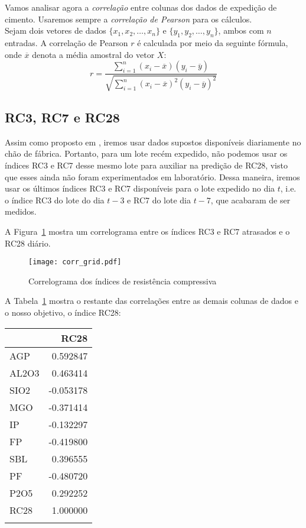Vamos analisar agora a \textit{correlação} entre colunas dos dados de expedição
de cimento. Usaremos sempre a \textit{correlação de Pearson} para os cálculos.
\\
Sejam dois vetores de
dados $\{x_1,x_2, \dots , x_n\}$ e $\{y_1,y_2, \dots , y_n\}$, ambos com $n$ entradas. A correlação de Pearson $r$ é calculada
por meio da seguinte fórmula, onde $\overline{x}$ denota a média amostral do
vetor $X$: \\



\[ r = \frac{{}\sum_{i=1}^{n} (x_i - \overline{x})(y_i - \overline{y})}
{\sqrt{\sum_{i=1}^{n} (x_i - \overline{x})^2(y_i - \overline{y})^2}} \] 


\bigskip

\subsection{RC3, RC7 e RC28}

Assim como proposto em \cite{grecialin}, iremos usar dados supostos disponíveis diariamente no chão de fábrica. Portanto, para um lote recém expedido,
não podemos usar os índices RC3 e RC7 desse mesmo lote para auxiliar na predição
de RC28, visto que esses ainda não foram experimentados em laboratório. Dessa maneira, iremos usar os últimos índices RC3 e RC7 disponíveis para o lote expedido no dia $t$,
i.e. o índice RC3 do lote do dia $t-3$ e RC7 do lote dia $t-7$, que acabaram de ser medidos. 

A Figura~\ref{fig:gridcorr} mostra um correlograma entre os índices RC3 e RC7
atrasados e o RC28 diário. 

\begin{figure}[H]
  \centering
  \texttt{[image: corr\_grid.pdf]}
  \caption{Correlograma dos índices de resistência compressiva}
  \label{fig:gridcorr}
\end{figure}

A Tabela~\ref{tabelacorr} mostra o restante das correlações entre as demais
colunas de dados e o nosso objetivo, o índice RC28:


\begin{table}[H]
  \centering
\begin{tabular}{lr}
  \toprule
  {} &      RC28 \\
  \midrule
  AGP   &  0.592847 \\
  AL2O3 &  0.463414 \\
  SIO2  & -0.053178 \\
  MGO   & -0.371414 \\
  IP    & -0.132297 \\
  FP    & -0.419800 \\
  SBL   &  0.396555 \\
  PF    & -0.480720 \\
  P2O5  &  0.292252 \\
  RC28  &  1.000000 \\
  \bottomrule
  \label{tabelacorr}
\end{tabular}
\end{table}



